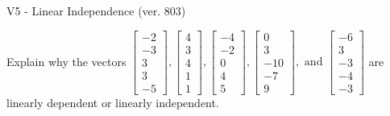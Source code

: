 \begin{exercise}
  \begin{exerciseTitle}V5 - Linear Independence (ver. 803)\end{exerciseTitle}
  \begin{exerciseStatement}
    Explain why the vectors \(\left[\begin{array}{r}
-2 \\
-3 \\
3 \\
3 \\
-5
\end{array}\right] , \left[\begin{array}{r}
4 \\
3 \\
4 \\
1 \\
1
\end{array}\right] , \left[\begin{array}{r}
-4 \\
-2 \\
0 \\
4 \\
5
\end{array}\right] , \left[\begin{array}{r}
0 \\
3 \\
-10 \\
-7 \\
9
\end{array}\right] , \text{ and } \left[\begin{array}{r}
-6 \\
3 \\
-3 \\
-4 \\
-3
\end{array}\right]\) are linearly dependent or linearly independent.	



\end{exerciseStatement}
\end{exercise}
